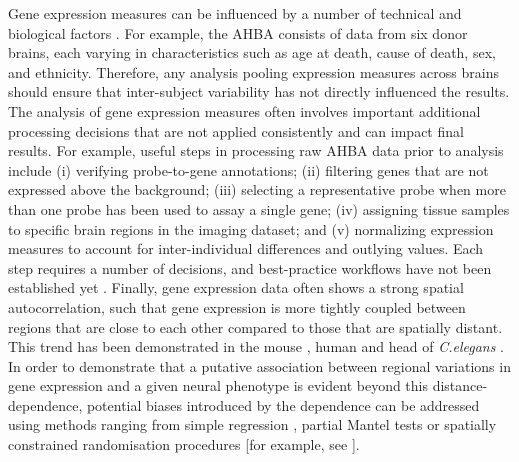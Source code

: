 Gene expression measures can be influenced by a number of technical and biological factors \citep{Fraser2005,Berchtold2008,Kumar2013,Trabzuni2013}.
For example, the AHBA consists of data from six donor brains, each varying in characteristics such as age at death, cause of death, sex, and ethnicity. Therefore, any analysis pooling expression measures across brains should ensure that inter-subject variability has not directly influenced the results. The analysis of gene expression measures often involves important additional processing decisions that are not applied consistently and can impact final results. For example, useful steps in processing raw AHBA data prior to analysis include (i) verifying probe-to-gene annotations; (ii) filtering genes that are not expressed above the background; (iii) selecting a representative probe when more than one probe has been used to assay a single gene; (iv) assigning tissue samples to specific brain regions in the imaging dataset; and (v) normalizing expression measures to account for inter-individual differences and outlying values. Each step requires a number of decisions, and best-practice workflows have not been established yet \citep{Arnatkeviciute2019}.
Finally, gene expression data often shows a strong spatial autocorrelation, such that gene expression is more tightly coupled between regions that are close to each other compared to those that are spatially distant. This trend has been demonstrated in the mouse \citep{Fulcher2016}, human \citep{Richiardi2015,Krienen2016,Pantazatos2017,Vertes2016b,Arnatkeviciute2019} and head of \textit{C.elegans} \citep{Arnatkeviciute2018}.
In order to demonstrate that a putative association between regional variations in gene expression and a given neural phenotype is evident beyond this distance-dependence, potential biases introduced by the dependence can be addressed using methods ranging from simple regression \citep{Fulcher2016}, partial Mantel tests \citep{French2011,Ji2014,Fakhry2015} or spatially constrained randomisation procedures [for example, see \citep{Vertes2016b,Burt2017,Seidlitz2018,Arnatkeviciute2019}].

